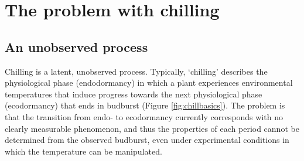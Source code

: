 \documentclass[11pt]{article}
\begin{document}
\section*{The problem with chilling}

\subsection*{An unobserved process}

Chilling is a latent, unobserved process. Typically, %
%
`chilling' describes the physiological phase (endodormancy) in which a plant experiences environmental temperatures that induce progress towards the next physiological phase (ecodormancy) that ends in budburst (Figure \ref{fig:chillbasics}). The problem is that the transition from endo- to ecodormancy currently corresponds with no clearly measurable phenomenon, and thus the properties of each period cannot be determined from the observed budburst, even under experimental conditions in which the temperature can be manipulated. 
\end{document}
